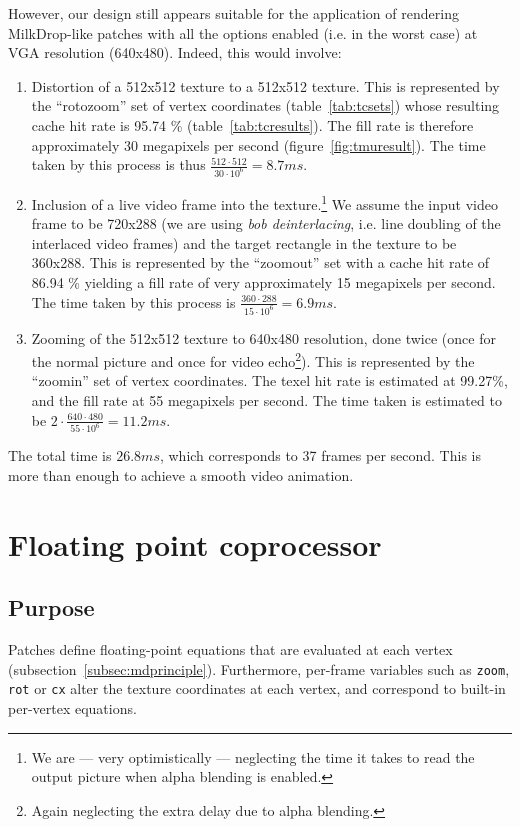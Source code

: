 \documentclass[a4paper,11pt]{kthesis}
\begin{document}
However, our design still appears suitable for the application of rendering MilkDrop-like patches with all the options enabled (i.e. in the worst case) at VGA resolution (640x480). Indeed, this would involve:
\begin{enumerate}
\item Distortion of a 512x512 texture to a 512x512 texture. This is represented by the ``rotozoom'' set of vertex coordinates (table~\ref{tab:tcsets}) whose resulting cache hit rate is 95.74 \% (table~\ref{tab:tcresults}). The fill rate is therefore approximately 30 megapixels per second (figure~\ref{fig:tmuresult}). The time taken by this process is thus $\frac{512 \cdot 512}{30 \cdot 10^{6}}=8.7\unit{ms}$.
\item Inclusion of a live video frame into the texture.\footnote{We are --- very optimistically --- neglecting the time it takes to read the output picture when alpha blending is enabled.} We assume the input video frame to be 720x288 (we are using \textit{bob deinterlacing}, i.e. line doubling of the interlaced video frames) and the target rectangle in the texture to be 360x288. This is represented by the ``zoomout'' set with a cache hit rate of 86.94 \% yielding a fill rate of very approximately 15 megapixels per second. The time taken by this process is $\frac{360 \cdot 288}{15 \cdot 10^{6}}=6.9\unit{ms}$.
\item Zooming of the 512x512 texture to 640x480 resolution, done twice (once for the normal picture and once for video echo\footnote{Again neglecting the extra delay due to alpha blending.}). This is represented by the ``zoomin'' set of vertex coordinates. The texel hit rate is estimated at 99.27\%, and the fill rate at 55 megapixels per second. The time taken is estimated to be $2 \cdot \frac{640 \cdot 480}{55 \cdot 10^{6}}=11.2\unit{ms}$.
\end{enumerate}

The total time is $26.8\unit{ms}$, which corresponds to 37 frames per second. This is more than enough to achieve a smooth video animation.

\chapter{Floating point coprocessor}
\label{ch:pfpu}
\section{Purpose}
\label{sec:pfpupurpose}
Patches define floating-point equations that are evaluated at each vertex (subsection~\ref{subsec:mdprinciple}). Furthermore, per-frame variables such as \verb!zoom!, \verb!rot! or \verb!cx! alter the texture coordinates at each vertex, and correspond to built-in per-vertex equations.
\end{document}
